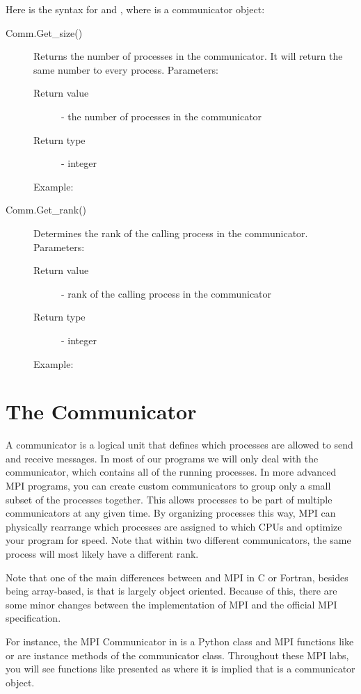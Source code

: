 Here is the syntax for  and , where  is a communicator object:
\begin{description}
\item[Comm.Get\_size()]
Returns the number of processes in the communicator. It will return the same number to every process.
Parameters:
\begin{description}
    \item[Return value] - the number of processes in the communicator
    \item[Return type] - integer
\end{description}
Example:

\item[Comm.Get\_rank()]
Determines the rank of the calling process in the communicator.
Parameters:
\begin{description}
    \item[Return value] - rank of the calling process in the communicator
    \item[Return type] - integer
\end{description}
Example:

\end{description}

\section*{The Communicator}
A communicator is a logical unit that defines which processes are allowed to send and receive messages.
In most of our programs we will only deal with the  communicator, which contains all of the running processes.
In more advanced MPI programs, you can create custom communicators to group only a small subset of the processes together.
This allows processes to be part of multiple communicators at any given time.
By organizing processes this way, MPI can physically rearrange which processes are assigned to which CPUs and optimize your program for speed.
Note that within two different communicators, the same process will most likely have a different rank.

Note that one of the main differences between  and MPI in C or Fortran, besides being array-based, is that  is largely object oriented.
Because of this, there are some minor changes between the  implementation of MPI and the official MPI specification.

For instance, the MPI Communicator in  is a Python class and MPI functions like  or  are instance methods of the communicator class.
Throughout these MPI labs, you will see functions like  presented as  where it is implied that  is a communicator object.

